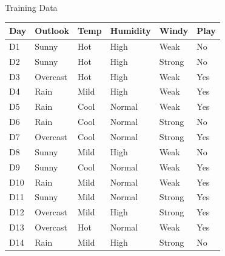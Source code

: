 \documentclass[usenames,dvipsnames]{beamer}
\begin{document}
	\renewcommand{\arraystretch}{0.85}
	\begin{frame}{Training Data}
	\begin{tabular}{lllll||l} \toprule
	\textbf{Day} & \textbf{Outlook}  & \textbf{Temp} & \textbf{Humidity} & \textbf{Windy}  & \textbf{Play} \\ \midrule
	D1  & Sunny    & Hot  & High     & Weak   & No   \\
	D2  & Sunny    & Hot  & High     & Strong & No   \\
	D3  & Overcast & Hot  & High     & Weak   & Yes  \\
	D4  & Rain     & Mild & High     & Weak   & Yes  \\
	D5  & Rain     & Cool & Normal   & Weak   & Yes  \\
	D6  & Rain     & Cool & Normal   & Strong & No   \\
	D7  & Overcast & Cool & Normal   & Strong & Yes  \\
	D8  & Sunny    & Mild & High     & Weak   & No   \\
	D9  & Sunny    & Cool & Normal   & Weak   & Yes  \\
	D10 & Rain     & Mild & Normal   & Weak   & Yes  \\
	D11 & Sunny    & Mild & Normal   & Strong & Yes  \\
	D12 & Overcast & Mild & High     & Strong & Yes  \\
	D13 & Overcast & Hot  & Normal   & Weak   & Yes  \\
	D14 & Rain     & Mild & High     & Strong & No  \\ \bottomrule
	\end{tabular}
\end{frame}
\end{document}
